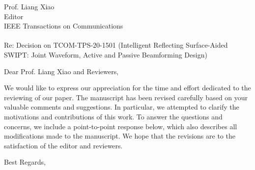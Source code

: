 \documentclass[a4paper, 10pt]{letter}
\date{}
\begin{document}
	\begin{letter}{Prof. Liang Xiao \\ Editor \\ IEEE Transactions on Communications \\ ~ \\ Re: Decision on TCOM-TPS-20-1501 (Intelligent Reflecting Surface-Aided SWIPT: Joint Waveform, Active and Passive Beamforming Design)}
		\opening{Dear Prof. Liang Xiao and Reviewers,}

		We would like to express our appreciation for the time and effort dedicated to the reviewing of our paper. The manuscript has been revised carefully based on your valuable comments and suggestions. In particular, we attempted to clarify the motivations and contributions of this work. To answer the questions and concerns, we include a point-to-point response below, which also describes all modifications made to the manuscript. We hope that the revisions are to the satisfaction of the editor and reviewers.

		\closing{Best Regards,}
	\end{letter}
\end{document}
